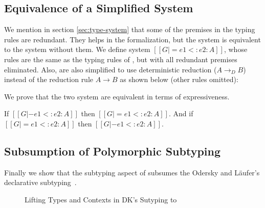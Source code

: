 \subsection{Equivalence of a Simplified System}

We mention in section \ref{sec:type-system} that some of the premises in the
typing rules are redundant. They helps in the formalization, but the system
is equivalent to the system without them. We define system
$[[G |= e1 <: e2 : A]]$, whose rules are the same as the typing rules of \name
, but with all redundant premises eliminated. Also, 
are also simplified to use deterministic reduction ($A \longrightarrow_D B$)
instead of the reduction rule $A \longrightarrow B$ as shown below (other rules omitted):


We prove that the two system are equivalent in terms of expressiveness.

\begin{theorem}
  If $[[G |- e1 <: e2 : A]]$ then $[[G |= e1 <: e2 : A]]$.
  And if $[[G |= e1 <: e2 : A]]$ then $[[G |- e1 <: e2 : A]]$.
\end{theorem}

\subsection{Subsumption of Polymorphic Subtyping}

Finally we show that the subtyping aspect of \name subsumes the Odersky and L\"aufer's declarative
subtyping~\cite{odersky1996putting}.

\begin{figure}
    \caption{Lifting Types and Contexts in DK's Sutyping to \name}
    \label{fig:lift}
\end{figure}

